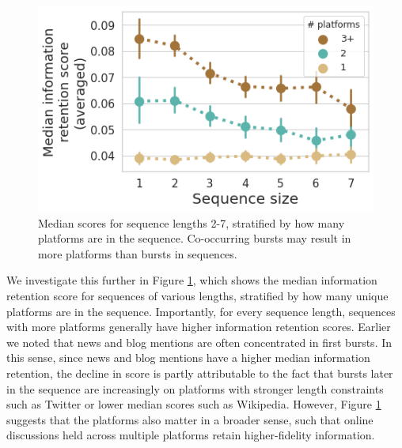 \documentclass[letterpaper]{article} %
\begin{document}
\begin{figure}[t]
    \centering
    \includegraphics[width=0.8\columnwidth]{figs/fig7_with6.png}
    \caption{Median scores for sequence lengths 2-7, stratified by how many platforms are in the sequence. Co-occurring bursts may result in more platforms than bursts in sequences.}
    \label{fig:heterogeneity}
\end{figure}

We investigate this further in Figure \ref{fig:heterogeneity}, which shows the median information retention score for sequences of various lengths, stratified by how many unique platforms are in the sequence. Importantly, for every sequence length, sequences with more platforms generally have higher information retention scores. Earlier we noted that news and blog mentions are often concentrated in first bursts. In this sense, since news and blog mentions have a higher median information retention, the decline in score is partly attributable to the fact that bursts later in the sequence are increasingly on platforms with stronger length constraints such as Twitter or lower median scores such as Wikipedia. However, Figure \ref{fig:heterogeneity} suggests that the platforms also matter in a broader sense, such that online discussions held across multiple platforms retain higher-fidelity information.
\end{document}
